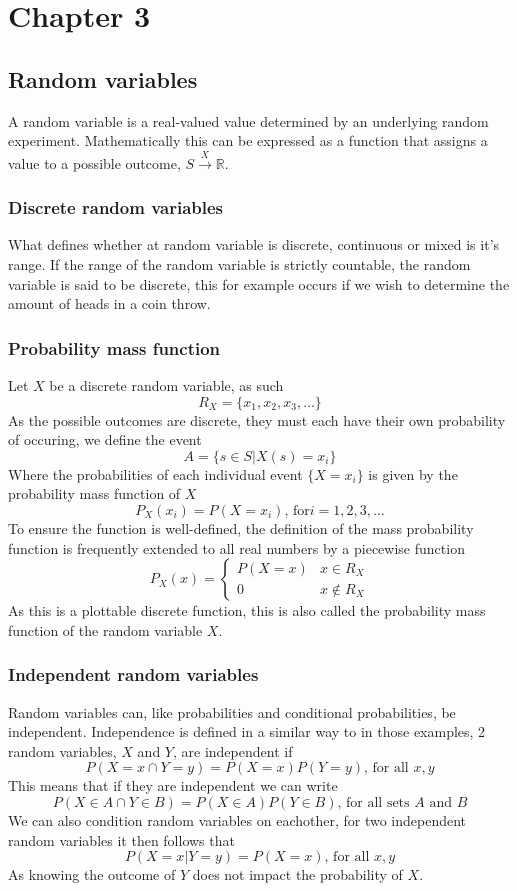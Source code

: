 \section{Chapter 3}
\subsection{Random variables}
\begin{definition}
    A random variable is a real-valued value determined by an underlying random experiment. Mathematically this can be expressed as a function that assigns a value to a possible outcome, $S\xrightarrow{X} \mathbb{R}$.
\end{definition}
\subsubsection{Discrete random variables}
What defines whether at random variable is discrete, continuous or mixed is it's range. If the range of the random variable is strictly countable, the random variable is said to be discrete, this for example occurs if we wish to determine the amount of heads in a coin throw.

\subsubsection{Probability mass function}
Let $X$ be a discrete random variable, as such
\[
    R_X=\{x_{1},x_{2},x_{3},\ldots\}
\]
As the possible outcomes are discrete, they must each have their own probability of occuring, we define the event
\[
    A=\{s\in S|X(s)=x_{i}\}
\]
Where the probabilities of each individual event $\{X=x_{i}\}$ is given by the probability mass function of $X$
\[
    P_{X}(x_{i})=P(X=x_{i})\text{, for} i=1,2,3,\ldots
\]
To ensure the function is well-defined, the definition of the mass probability function is frequently extended to all real numbers by a piecewise function
\[
    P_{X}(x)=\begin{cases}P(X=x) & x\in R_X \\ 0 & x\notin R_X\end{cases}
\]
As this is a plottable discrete function, this is also called the probability mass function of the random variable $X$.

\subsubsection{Independent random variables}
Random variables can, like probabilities and conditional probabilities, be independent. Independence is defined in a similar way to in those examples, 2 random variables, $X$ and $Y$, are independent if
\[
    P(X=x\cap Y=y)=P(X=x)P(Y=y) \text{, for all } x,y
\]
This means that if they are independent we can write
\[
    P(X\in A\cap Y\in B)=P(X\in A)P(Y\in B)\text{, for all sets } A \text{ and } B
\]
We can also condition random variables on eachother, for two independent random variables it then follows that
\[
    P(X=x|Y=y)=P(X=x)\text{, for all } x,y
\]
As knowing the outcome of $Y$ does not impact the probability of $X$.

